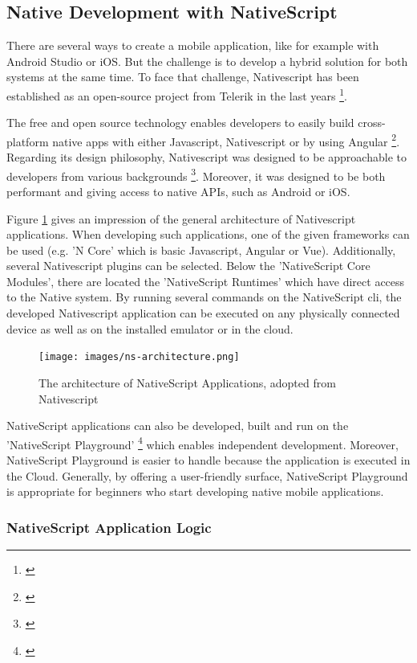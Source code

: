 \subsection{Native Development with NativeScript} 

There are several ways to create a mobile application, like for example with Android Studio or iOS. But the challenge is to develop a hybrid solution for both systems at the same time.
To face that challenge, Nativescript has been established as an open-source project from Telerik in the last years \footnote{\cite{nativescript}}. 

The free and open source technology enables developers to easily build cross-platform native apps with either Javascript, Nativescript or by using Angular \footnote{\cite{nativescript}}. 
Regarding its design philosophy, Nativescript was designed to be approachable to developers from various backgrounds \footnote{\cite{nativescript}}. Moreover, it was designed to be both performant and giving access to native APIs, such as Android or iOS.

Figure \ref{nsarchitecture} gives an impression of the general architecture of Nativescript applications. When developing such applications, one of the given frameworks can be used (e.g. 'N Core' which is basic Javascript, Angular or Vue). Additionally, several Nativescript plugins can be selected. Below the 'NativeScript Core Modules', there are located the 'NativeScript Runtimes' which have direct access to the Native system. By running several commands on the NativeScript \ac{cli}, the developed Nativescript application can be executed on any physically connected device as well as on the installed emulator or in the cloud. 

\begin{figure}[h!]
	\centering
	\texttt{[image: images/ns-architecture.png]}
	\caption{The architecture of NativeScript Applications, adopted from Nativescript}
	\label{nsarchitecture}
\end{figure}

NativeScript applications can also be developed, built and run on the 'NativeScript Playground' \footnote{\cite{nsplayground}} which enables independent development. Moreover, NativeScript Playground is easier to handle because the application is executed in the Cloud. Generally, by offering a user-friendly surface, NativeScript Playground is appropriate for beginners who start developing native mobile applications.

\subsubsection{NativeScript Application Logic}

